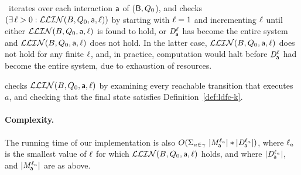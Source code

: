 

%
\ iterates over each interaction $\mathsf{a}$ of ($\mathsf{B}, Q_0$), and checks 
$(\exists\, \ell > 0: \mathcal{LLIN}(B, Q_0, \mathsf{a}, \ell))$ by starting with $\ell=1$ and incrementing $\ell$ until
either $\mathcal{LLIN}(B, Q_0, \mathsf{a}, \ell)$ is found to hold, or 
$\mathit{D}_{\mathsf{a}}^{\ell}$ has become the entire system and $\mathcal{LLIN}(B, Q_0, \mathsf{a}, \ell)$ does not hold. In the latter case, 
$\mathcal{LLIN}(B, Q_0, \mathsf{a}, \ell)$ does not hold for any finite $\ell$, and, in practice, 
computation would halt 
before $\mathit{D}_{\mathsf{a}}^{\ell}$ had become the entire system, due to exhaustion of resources.

 checks $\mathcal{LLIN}(B, Q_0, \mathsf{a}, \ell)$ by examining every reachable transition
that executes $a$, and checking that the final state satisfies
Definition~\ref{def:ldfc-k}. 


\paragraph{Complexity.} The running  time of our implementation is
also 
$O(\Sigma_{a \in \gamma}\ |\mathit{M}_{\mathsf{a}}^{\ell_a}| * |\mathit{D}_{\mathsf{a}}^{\ell_a}|)$,
where $\ell_a$ is the smallest value of $\ell$ for which $\mathcal{LLIN}(B, Q_0, \mathsf{a}, \ell)$ holds, and where
$|\mathit{D}_{\mathsf{a}}^{\ell_a}|$, and $|\mathit{M}_{\mathsf{a}}^{\ell_a}|$ are as above.





